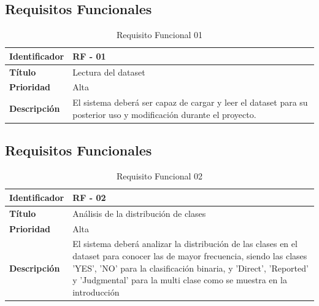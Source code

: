\subsection {Requisitos Funcionales}
\begin{table}[H] 
\begin{center}
\begin{tabular} {|P{4cm}|P{10cm}|}\hline
   {\bf Identificador} &{\bf RF - 01}\\ \hline
  \textbf{Título}& Lectura del dataset\\ \hline
  \textbf{Prioridad}& Alta \\ \hline
  \textbf{Descripción}&
  El sistema deberá ser capaz de cargar y leer el dataset para su posterior uso y modificación durante el proyecto. \\ \hline
\end{tabular}
\end{center}
\vspace{-0.6cm}
\caption{Requisito Funcional 01}
\end{table}

\subsection {Requisitos Funcionales}
\begin{table}[H] 
\begin{center}
\begin{tabular} {|P{4cm}|P{10cm}|}\hline
   {\bf Identificador} &{\bf RF - 02}\\ \hline
  \textbf{Título}& Análisis de la distribución de clases\\ \hline
  \textbf{Prioridad}& Alta \\ \hline
  \textbf{Descripción}& 
  El sistema deberá analizar la distribución de las clases en el dataset para conocer las de mayor frecuencia, siendo las clases 'YES', 'NO' para la clasificación binaria, y 'Direct', 'Reported' y 'Judgmental' para la multi clase como se muestra en la introducción\\ \hline
\end{tabular}
\end{center}
\vspace{-0.6cm}
\caption{Requisito Funcional 02}
\end{table}

